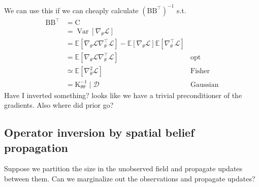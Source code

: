 \documentclass{article}
\newcommand{\var}{\operatorname{Var}}
\newcommand{\mm}[1]{\mathrm{#1}}
\newcommand{\gvn}{\mid}
\newcommand{\Ex}{\mathbb{E}}
\begin{document}
We can use this if we can cheaply calculate \((\mm{B}\mm{B}^{\top})^{-1}\) s.t.
\begin{align*}
\mm{B}\mm{B}^{\top}
    &=\mm{C}\\
    &= \var\left[\nabla_{\theta}\mathcal{L}\right]\\
    &= \Ex\left[\nabla_{\theta}\mathcal{L}\nabla_{\theta}^{\top}\mathcal{L}\right]
    - \Ex\left[\nabla_{\theta}\mathcal{L}\right]\Ex\left[\nabla_{\theta}^{\top}\mathcal{L}\right]\\
    &= \Ex\left[\nabla_{\theta}\mathcal{L}\nabla_{\theta}^{\top}\mathcal{L}\right] &\text{opt}\\
    &\simeq \Ex\left[\nabla^2_{\theta}\mathcal{L}\right] &\text{Fisher}\\
    &= \mm{K}_{\theta\theta}^{-1} \gvn\mathcal{D} &\text{Gaussian}
\end{align*}
Have I inverted something? looks like we have a trivial preconditioner of the gradients.
Also where did prior go?


\subsection{Operator inversion by spatial belief propagation}

Suppose we partition the size in the unobserved field and propagate updates between them.
Can we marginalize out the observations and propagate updates?
\end{document}

